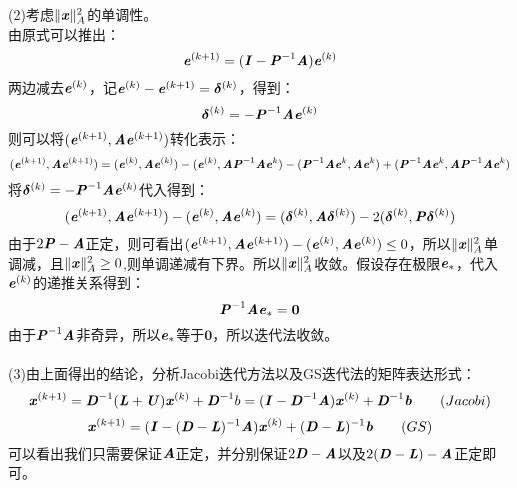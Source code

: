 \documentclass{article}
\newcommand{\xc}[1]{\textbf{\emph{#1}}}
\begin{document}
\begin{itemize}
		(2)考虑$\|\xc{x}\|_A^2$的单调性。\\
		由原式可以推出：
		$$
			\xc{e}^{(k+1)} = (\xc{I} - \xc{P}^{-1}\xc{A})\xc{e}^{(k)}
		$$
		两边减去$\xc{e}^{(k)}$，记$\xc{e}^{(k)} - \xc{e}^{(k + 1)} = \bm{\delta}^{(k)}$，得到：
		$$
				\bm{\delta}^{(k)} = -\xc{P}^{-1}\xc{A}\xc{e}^{(k)}
		$$
		则可以将$(\xc{e}^{(k+1)}, \xc{A}\xc{e}^{(k+1)})$转化表示：
		$$
			(\xc{e}^{(k+1)}, \xc{A}\xc{e}^{(k+1)}) = (\xc{e}^{(k)}, \xc{A}\xc{e}^{(k)}) - (\xc{e}^{(k)}, \xc{A}\xc{P}^{-1}\xc{A}\xc{e}^{k}) - (\xc{P}^{-1}\xc{A}\xc{e}^k, \xc{A}\xc{e}^k) + (\xc{P}^{-1}\xc{A}\xc{e}^{k}, \xc{A}\xc{P}^{-1}\xc{A}\xc{e}^k)
		$$
		将$	\bm{\delta}^{(k)} = -\xc{P}^{-1}\xc{A}\xc{e}^{(k)}$代入得到：
		$$
			(\xc{e}^{(k+1)}, \xc{A}\xc{e}^{(k+1)}) -  (\xc{e}^{(k)}, \xc{A}\xc{e}^{(k)}) = (\bm{\delta}^{(k)}, \xc{A}\bm{\delta}^{(k)}) - 2(\bm{\delta}^{(k)}, \xc{P}\bm{\delta}^{(k)}) 
		$$
		由于$2\xc{P} - \xc{A}$正定，则可看出$(\xc{e}^{(k+1)}, \xc{A}\xc{e}^{(k+1)}) -  (\xc{e}^{(k)}, \xc{A}\xc{e}^{(k)}) \le 0$，所以$\|\xc{x}\|_A^2$单调减，且$\|\xc{x}\|_A^2 \ge 0$,则单调递减有下界。所以$\|\xc{x}\|_A^2$收敛。假设存在极限$\xc{e}_{*}$，代入$\xc{e}^{(k)}$的递推关系得到：
		$$
			\xc{P}^{-1}\xc{A}\xc{e}_{*} = \bm{0}
		$$
		由于$\xc{P}^{-1}\xc{A}$非奇异，所以$\xc{e}_{*}$等于$\bm{0}$，所以迭代法收敛。\\
		\\
		(3)由上面得出的结论，分析Jacobi迭代方法以及GS迭代法的矩阵表达形式：
		$$
			\xc{x}^{(k+1)} = \xc{D}^{-1}(\xc{L}+\xc{U})\xc{x}^{(k)} + \xc{D}^{-1}b = (\xc{I} -  \xc{D}^{-1}\xc{A})\xc{x}^{(k)} + \xc{D}^{-1}\xc{b} \qquad (Jacobi)
		$$
		$$
			\xc{x}^{(k+1)} = (\xc{I} - (\xc{D}-\xc{L})^{-1}\xc{A})\xc{x}^{(k)} + (\xc{D} -\xc{L})^{-1}\xc{b} \qquad (GS)
		$$
		可以看出我们只需要保证$\xc{A}$正定，并分别保证$2\xc{D} - \xc{A}$以及$2(\xc{D}- \xc{L}) - \xc{A}$正定即可。\\
		\\
		

\end{itemize}
\end{document}
